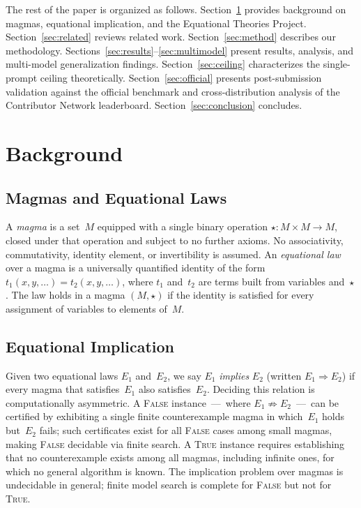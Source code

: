 \documentclass[11pt]{article}
\begin{document}
The rest of the paper is organized as follows. Section~\ref{sec:background}
provides background on magmas, equational implication, and the
Equational Theories Project. Section~\ref{sec:related} reviews related
work. Section~\ref{sec:method} describes our methodology.
Sections~\ref{sec:results}--\ref{sec:multimodel} present results,
analysis, and multi-model generalization findings.
Section~\ref{sec:ceiling} characterizes the single-prompt ceiling
theoretically. Section~\ref{sec:official} presents post-submission
validation against the official benchmark and cross-distribution
analysis of the Contributor Network leaderboard.
Section~\ref{sec:conclusion} concludes.

\section{Background}
\label{sec:background}

\subsection{Magmas and Equational Laws}

A \emph{magma} is a set~$M$ equipped with a single binary operation
${\star} : M \times M \to M$, closed under that operation and subject
to no further axioms. No associativity, commutativity, identity
element, or invertibility is assumed. An \emph{equational law} over a
magma is a universally quantified identity of the form
$t_1(x, y, \ldots) = t_2(x, y, \ldots)$, where $t_1$ and~$t_2$ are
terms built from variables and~$\star$. The law holds in a magma
$(M,\star)$ if the identity is satisfied for every assignment of
variables to elements of~$M$.

\subsection{Equational Implication}

Given two equational laws $E_1$ and~$E_2$, we say $E_1$ \emph{implies}
$E_2$ (written $E_1 \Rightarrow E_2$) if every magma that
satisfies~$E_1$ also satisfies~$E_2$. Deciding this relation is
computationally asymmetric. A \textsc{False} instance~---~where
$E_1 \not\Rightarrow E_2$~---~can be certified by exhibiting a single
finite counterexample magma in which~$E_1$ holds but~$E_2$ fails; such
certificates exist for all \textsc{False} cases among small magmas,
making \textsc{False} decidable via finite search. A \textsc{True}
instance requires establishing that no counterexample exists among all
magmas, including infinite ones, for which no general algorithm is
known. The implication problem over magmas is undecidable in general;
finite model search is complete for \textsc{False} but not for
\textsc{True}.
\end{document}
